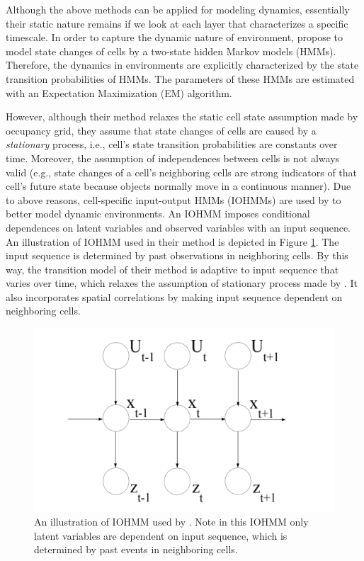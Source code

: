 Although the above methods can be applied for modeling dynamics, essentially their static nature remains if we look at each layer that characterizes a specific timescale. In order to capture the dynamic nature of environment, \citet{meyer2012occupancy} propose to model state changes of cells by a two-state hidden Markov models (HMMs). Therefore, the dynamics in environments are explicitly characterized by the state transition probabilities of HMMs. The parameters of these HMMs are estimated with an Expectation Maximization (EM) algorithm. 

However, although their method relaxes the static cell state assumption made by occupancy grid, they assume that state changes of cells are caused by a \textit{stationary} process, i.e., cell's state transition probabilities are constants over time. Moreover, the assumption of independences between cells is not always valid (e.g., state changes of a cell's neighboring cells are strong indicators of that cell's future state because objects normally move in a continuous manner). Due to above reasons, cell-specific input-output HMMs (IOHMMs) are used by \citet{wang2014modeling} to better model dynamic environments. An IOHMM imposes conditional dependences on latent variables and observed variables with an input sequence. An illustration of IOHMM used in their method is depicted in Figure \ref{fig:IOHMM}. The input sequence is determined by past observations in neighboring cells. By this way, the transition model of their method is adaptive to input sequence that varies over time, which relaxes the assumption of stationary process made by \citet{meyer2012occupancy}. It also incorporates spatial correlations by making input sequence dependent on neighboring cells. 

\begin{figure}[H]
  \centering
    \includegraphics[width=.6\textwidth]{figures/IOHMM.png}
    \caption[An illustration of IOHMM.]{An illustration of IOHMM used by \citet{wang2014modeling}. Note in this IOHMM only latent variables are dependent on input sequence, which is determined by past events in neighboring cells.}
    \label{fig:IOHMM}
\end{figure} 

